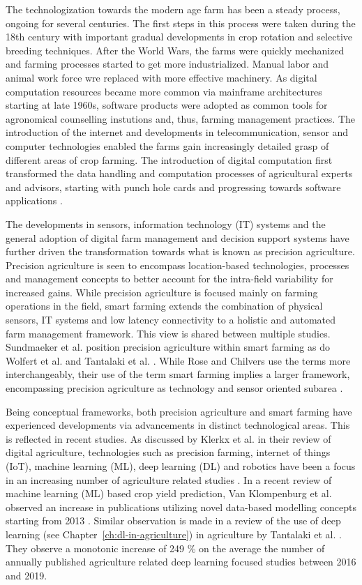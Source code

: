 The technologization towards the modern age farm has been a steady process, ongoing for several centuries. The first steps in this process were taken during the 18th century with important gradual developments in crop rotation and selective breeding techniques. After the World Wars, the farms were quickly mechanized and farming processes started to get more industrialized. Manual labor and animal work force wre replaced with more effective machinery. As digital computation resources became more common via mainframe architectures starting at late 1960s, software products were adopted as common tools for agronomical counselling instutions and, thus, farming management practices. The introduction of the internet and developments in telecommunication, sensor and computer technologies enabled the farms gain increasingly detailed grasp of different areas of crop farming. The introduction of digital computation first transformed the data handling and computation processes of agricultural experts and advisors, starting with punch hole cards and progressing towards software applications \cite{Syvajarvi2016}. 

The developments in sensors, information technology (IT) systems and the general adoption of digital farm management and decision support systems have further driven the transformation towards what is known as precision agriculture. Precision agriculture is seen to encompass location-based technologies, processes and management concepts to better account for the intra-field variability for increased gains. While precision agriculture is focused mainly on farming operations in the field, smart farming extends the combination of physical sensors, IT systems and low latency connectivity to a holistic and automated farm management framework. This view is shared between multiple studies. Sundmaeker et al. \cite{Sundmaeker2016} position precision agriculture within smart farming as do Wolfert et al. \cite{Wolfert2017d} and Tantalaki et al. \cite{Tantalaki2019}. While Rose and Chilvers use the terms more interchangeably, their use of the term smart farming implies a larger framework, encompassing precision agriculture as technology and sensor oriented subarea \cite{Rose2018}.

Being conceptual frameworks, both precision agriculture and smart farming have experienced developments via advancements in distinct technological areas. This is reflected in recent studies. As discussed by Klerkx et al. in their review of digital agriculture, technologies such as precision farming, internet of things (IoT), machine learning (ML), deep learning (DL) and robotics have been a focus in an increasing number of agriculture related studies \cite{Klerkx2019}. In a recent review of machine learning (ML) based crop yield prediction, Van Klompenburg et al. observed an increase in publications utilizing novel data-based modelling concepts starting from 2013 \cite{VanKlompenburg2020}. Similar observation is made in a review of the use of deep learning (see Chapter~\ref{ch:dl-in-agriculture}) in agriculture by Tantalaki et al. \cite{Tantalaki2019}. They observe a monotonic increase of 249 \% on the average the number of annually published agriculture related deep learning focused studies between 2016 and 2019. 


